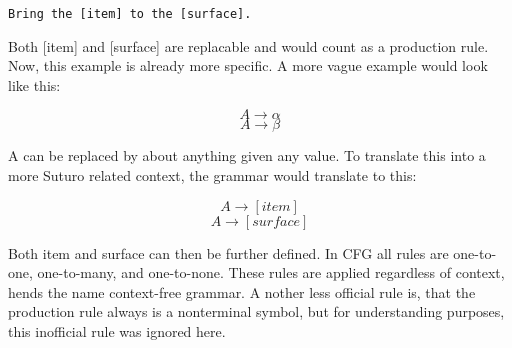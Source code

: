 \documentclass[main.tex]{subfiles}
\begin{document}
\begin{verbatim}
Bring the [item] to the [surface].
\end{verbatim}

Both [item] and [surface] are replacable and would count as a production rule. Now, this example is already more specific. A more vague example would look like this:

\begin{equation}
A \rightarrow \alpha
\end{equation}
\begin{equation}
A \rightarrow \beta
\end{equation}

A can be replaced by about anything given any value. To translate this into a more Suturo related context, the grammar would translate to this:

\begin{equation}
A \rightarrow [item] 
\end{equation}
\begin{equation}
A \rightarrow [surface]
\end{equation}

Both item and surface can then be further defined. In CFG all rules are one-to-one, one-to-many, and one-to-none. These rules are applied regardless of context, hends the name context-free grammar. A nother less official rule is, that the production rule always is a nonterminal symbol, but for understanding purposes, this inofficial rule was ignored here.
\end{document}
